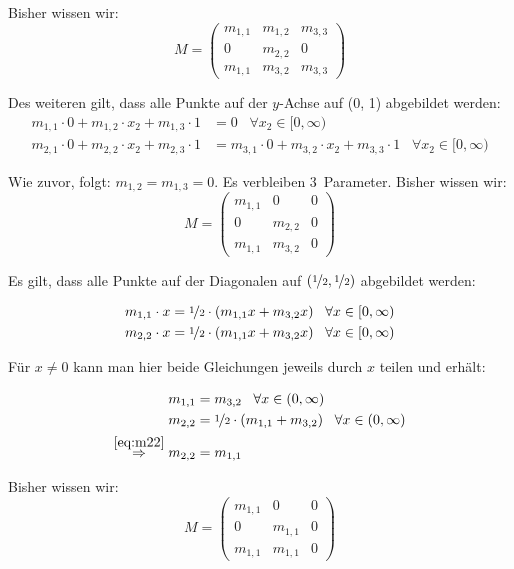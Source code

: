 \documentclass[a4paper]{scrartcl}
\begin{document}
Bisher wissen wir:\nobreak
\[M = \begin{pmatrix}            m_{1,1} & m_{1,2} & m_{3,3}\\
                                       0 & m_{2,2} & 0\\
                                 m_{1,1} & m_{3,2} & m_{3,3}\end{pmatrix}\]

\goodbreak
Des weiteren gilt, dass alle Punkte auf der $y$-Achse auf (0, 1) abgebildet werden:\nobreak
\begin{align}
    m_{1,1} \cdot 0 + m_{1,2} \cdot x_2 + m_{1,3} \cdot 1 &= 0 \;\;\; \forall x_2 \in [0, \infty)\\
    m_{2,1} \cdot 0 + m_{2,2} \cdot x_2 + m_{2,3} \cdot 1 &= m_{3,1} \cdot 0 + m_{3,2} \cdot x_2 + m_{3,3} \cdot 1 \;\;\; \forall x_2 \in [0, \infty)
\end{align}

Wie zuvor, folgt: $m_{1,2} = m_{1,3} = 0$. Es verbleiben 3~Parameter.
\goodbreak
Bisher wissen wir:\nobreak
\[M = \begin{pmatrix}      m_{1,1} &       0 & 0\\
                                 0 & m_{2,2} & 0\\
                           m_{1,1} & m_{3,2} & 0\end{pmatrix}\]

Es gilt, dass alle Punkte auf der Diagonalen auf $(\nicefrac{1}{2}, \nicefrac{1}{2})$
abgebildet werden:

\begin{align}
    m_{1,1} \cdot x &= \nicefrac{1}{2} \cdot (m_{1,1} x + m_{3,2} x) \;\;\; \forall x \in [0, \infty)\\
    m_{2,2} \cdot x &= \nicefrac{1}{2} \cdot (m_{1,1} x + m_{3,2} x) \;\;\; \forall x \in [0, \infty)
\end{align}

Für $x \neq 0$ kann man hier beide Gleichungen jeweils durch $x$ teilen und erhält:

\begin{align}
    m_{1,1} &= m_{3,2} \;\;\; \forall x \in (0, \infty)\\
    m_{2,2} &= \nicefrac{1}{2} \cdot (m_{1,1} + m_{3,2}) \;\;\; \forall x \in (0, \infty)\label{eq:m22}\\
    \overset{\ref{eq:m22}}{\Rightarrow} m_{2,2} &= m_{1,1}
\end{align}

Bisher wissen wir:\nobreak
\[M = \begin{pmatrix}      m_{1,1} &       0 & 0\\
                                 0 & m_{1,1} & 0\\
                           m_{1,1} & m_{1,1} & 0\end{pmatrix}\]
\end{document}
